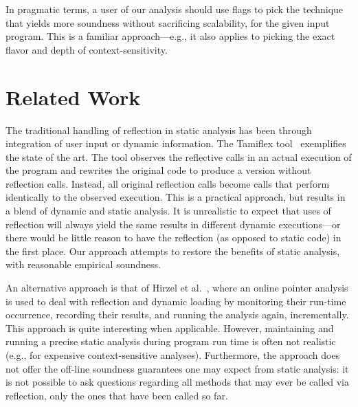 


In pragmatic terms, a user of our analysis should use flags to pick
the technique that yields more soundness without sacrificing
scalability, for the given input program. This is a familiar
approach---e.g., it also applies to picking the exact flavor and depth
of context-sensitivity.




\section{Related Work}
\label{sec:related}

The traditional handling of reflection in static analysis has been
through integration of user input or dynamic information.  The
Tamiflex tool~\cite{icse/BoddenSSOM11} exemplifies the state of the
art. The tool observes the reflective calls in an actual execution of
the program and rewrites the original code to produce a version
without reflection calls. Instead, all original reflection calls
become calls that perform identically to the observed execution. This
is a practical approach, but results in a blend of dynamic and static
analysis.
It is unrealistic to expect that uses of reflection will always yield
the same results in different dynamic executions---or there would be
little reason to have the reflection (as opposed to static code) in
the first place. Our approach attempts to restore the benefits of
static analysis, with reasonable empirical soundness.

An alternative approach is that of Hirzel et
al.~\cite{ecoop/HirzelDH04,toplas/HirzelDDH07}, where an online
pointer analysis is used to deal with reflection and dynamic loading
by monitoring their run-time occurrence, recording their results, and
running the analysis again, incrementally. This approach is quite
interesting when applicable. However, 
maintaining and running a precise static
analysis during program run time is often not realistic (e.g., for
expensive context-sensitive analyses). Furthermore, the approach does
not offer the off-line soundness guarantees one may expect from static
analysis: it is not possible to ask questions regarding all methods
that may ever be called via reflection, only the ones that have been
called so far.

